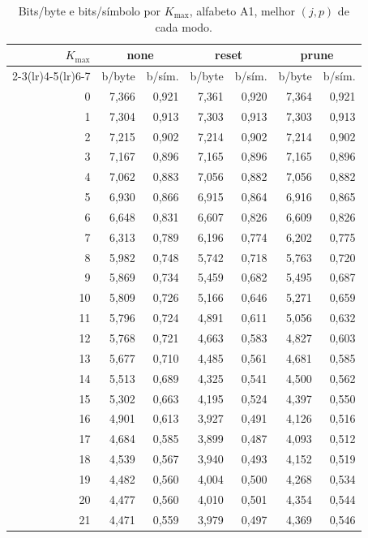 \begin{table}[H]
\centering
\small
\caption{Bits/byte e bits/s\'imbolo por $K_{\max}$, alfabeto A1, melhor $(j,p)$ de cada modo.}
\label{tab:kmax-A1}
\begin{tabular}{rrrrrrr}
\toprule
$K_{\max}$ & \multicolumn{2}{c}{none} & \multicolumn{2}{c}{reset} & \multicolumn{2}{c}{prune} \\
\cmidrule(lr){2-3}\cmidrule(lr){4-5}\cmidrule(lr){6-7}
 & b/byte & b/s\'im. & b/byte & b/s\'im. & b/byte & b/s\'im. \\
\midrule
0 & 7,366 & 0,921 & 7,361 & 0,920 & 7,364 & 0,921 \\
1 & 7,304 & 0,913 & 7,303 & 0,913 & 7,303 & 0,913 \\
2 & 7,215 & 0,902 & 7,214 & 0,902 & 7,214 & 0,902 \\
3 & 7,167 & 0,896 & 7,165 & 0,896 & 7,165 & 0,896 \\
4 & 7,062 & 0,883 & 7,056 & 0,882 & 7,056 & 0,882 \\
5 & 6,930 & 0,866 & 6,915 & 0,864 & 6,916 & 0,865 \\
6 & 6,648 & 0,831 & 6,607 & 0,826 & 6,609 & 0,826 \\
7 & 6,313 & 0,789 & 6,196 & 0,774 & 6,202 & 0,775 \\
8 & 5,982 & 0,748 & 5,742 & 0,718 & 5,763 & 0,720 \\
9 & 5,869 & 0,734 & 5,459 & 0,682 & 5,495 & 0,687 \\
10 & 5,809 & 0,726 & 5,166 & 0,646 & 5,271 & 0,659 \\
11 & 5,796 & 0,724 & 4,891 & 0,611 & 5,056 & 0,632 \\
12 & 5,768 & 0,721 & 4,663 & 0,583 & 4,827 & 0,603 \\
13 & 5,677 & 0,710 & 4,485 & 0,561 & 4,681 & 0,585 \\
14 & 5,513 & 0,689 & 4,325 & 0,541 & 4,500 & 0,562 \\
15 & 5,302 & 0,663 & 4,195 & 0,524 & 4,397 & 0,550 \\
16 & 4,901 & 0,613 & 3,927 & 0,491 & 4,126 & 0,516 \\
17 & 4,684 & 0,585 & 3,899 & 0,487 & 4,093 & 0,512 \\
18 & 4,539 & 0,567 & 3,940 & 0,493 & 4,152 & 0,519 \\
19 & 4,482 & 0,560 & 4,004 & 0,500 & 4,268 & 0,534 \\
20 & 4,477 & 0,560 & 4,010 & 0,501 & 4,354 & 0,544 \\
21 & 4,471 & 0,559 & 3,979 & 0,497 & 4,369 & 0,546 \\

\end{tabular}
\end{table}
